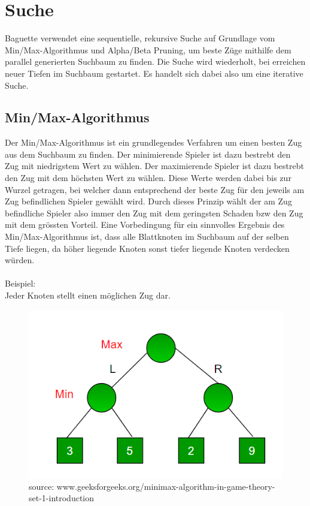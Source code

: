 \lstset{language=Java}
\section{Suche}\label{search}
Baguette verwendet eine sequentielle, rekursive Suche auf Grundlage vom Min/Max-Algorithmus und Alpha/Beta Pruning, um beste Z\"uge mithilfe dem parallel generierten Suchbaum zu finden.
Die Suche wird wiederholt, bei erreichen neuer Tiefen im Suchbaum gestartet.
Es handelt sich dabei also um eine iterative Suche.

\subsection{Min/Max-Algorithmus}
Der Min/Max-Algorithmus ist ein grundlegendes Verfahren um einen besten Zug aus dem Suchbaum zu finden.
Der minimierende Spieler ist dazu bestrebt den Zug mit niedrigstem Wert zu w\"ahlen.
Der maximierende Spieler ist dazu bestrebt den Zug mit dem h\"ochsten Wert zu w\"ahlen.
Diese Werte werden dabei bis zur Wurzel getragen, bei welcher dann entsprechend der beste Zug f\"ur den jeweils am Zug befindlichen Spieler gew\"ahlt wird.
Durch dieses Prinzip w\"ahlt der am Zug befindliche Spieler also immer den Zug mit dem geringsten Schaden bzw den Zug mit dem gr\"ossten Vorteil.
Eine Vorbedingung f\"ur ein sinnvolles Ergebnis des Min/Max-Algorithmus ist, dass alle Blattknoten im Suchbaum auf der selben Tiefe liegen,
da h\"oher liegende Knoten sonst tiefer liegende Knoten verdecken w\"urden.
\\\\
Beispiel:\\Jeder Knoten stellt einen m\"oglichen Zug dar.
\begin{figure}[h]
\begin{center}
\includegraphics[scale=0.5]{minmax.png}
\caption{source: www.geeksforgeeks.org/minimax-algorithm-in-game-theory-set-1-introduction}
\end{center}
\end{figure}

